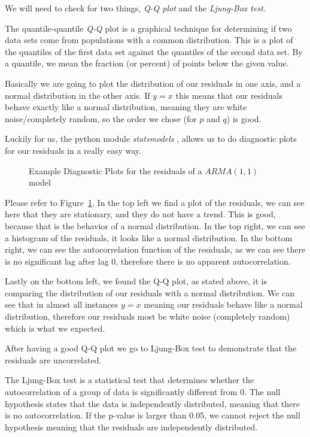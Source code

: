 \documentclass[journal]{IEEEtran}
\begin{document}
We will need to check for two things, \emph{Q-Q plot} and the \emph{Ljung-Box
test}.

The quantile-quantile \emph{Q-Q} plot is a graphical technique for determining
if two data sets come from populations with a common distribution.  This is a
plot of the quantiles of the first data set against the quantiles of the
second data set. By a quantile, we mean the fraction (or percent) of points
below the given value. \cite{qq}

Basically we are going to plot the distribution of our residuals in one axis,
and a normal distribution in the other axis. If $y=x$ this means that our
residuals behave exactly like a normal distribution, meaning they are white
noise/completely random, so the order we chose (for $p$ and $q$) is good.

Luckily for us, the python module \emph{statsmodels} \cite{statsmodels},
allows us to do diagnostic plots for our residuals in a really easy way.

\begin{figure}[htbp]
  \centering
  
    \caption{Example Diagnostic Plots for the residuals of a $ARMA(1,1)$ model}
  \label{fig:diag-example}
\end{figure}

Please refer to Figure~\ref{fig:diag-example}. In the top left we find a plot
of the residuals, we can see here that they are stationary, and they do not
have a trend. This is good, because that is the behavior of a normal
distribution. In the top right, we can see a histogram of the residuals, it
looks like a normal distribution. In the bottom right, we can see the
autocorrelation function of the residuals, as we can see there is no
significant lag after lag 0, therefore there is no apparent autocorrelation.

Lastly on the bottom left, we found the Q-Q plot, as stated above, it is
comparing the distribution of our residuals with a normal distribution. We
can see that in almost all instances $y=x$ meaning our residuals behave like a
normal distribution, therefore our residuals most be white noise (completely
random) which is what we expected.

After having a good Q-Q plot we go to Ljung-Box test to demonstrate that the
residuals are uncorrelated.

The Ljung-Box test is a statistical test that determines whether the
autocorrelation of a group of data is significantly different from 0.
The null hypothesis states that the data is independently distributed,
meaning that there is no autocorrelation. If the p-value is larger than
0.05, we cannot reject the null hypothesis meaning that the residuals are
independently distributed. \cite{timeseries}
\end{document}
